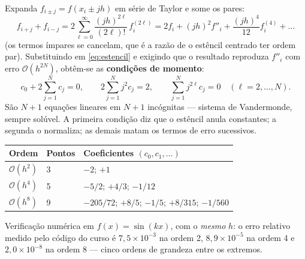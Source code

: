 \documentclass[11pt,a4paper,oneside]{report}
\begin{document}
\begin{derivacao}
Expanda $f_{i\pm j} = f(x_i \pm jh)$ em s\'erie de Taylor e some os pares:
\[
f_{i+j} + f_{i-j}
 = 2\sum_{\ell=0}^{\infty} \frac{(jh)^{2\ell}}{(2\ell)!}\, f^{(2\ell)}_i
 = 2f_i + (jh)^2 f''_i + \frac{(jh)^4}{12}f^{(4)}_i + \dots
\]
(os termos \'impares se cancelam, que \'e a raz\~ao de o est\^encil centrado
ter ordem par). Substituindo em \eqref{eq:estencil} e exigindo que o resultado
reproduza $f''_i$ com erro $\mathcal{O}(h^{2N})$, obt\^em-se as
\textbf{condi\c{c}\~oes de momento}:
\begin{equation}
c_0 + 2\sum_{j=1}^{N} c_j = 0,
\qquad
2\sum_{j=1}^{N} j^{2} c_j = 2,
\qquad
\sum_{j=1}^{N} j^{2\ell} c_j = 0 \quad (\ell = 2,\dots,N).
\end{equation}
S\~ao $N+1$ equa\c{c}\~oes lineares em $N+1$ inc\'ognitas --- sistema de
Vandermonde, sempre sol\'uvel. A primeira condi\c{c}\~ao diz que o est\^encil
anula constantes; a segunda o normaliza; as demais matam os termos de erro
sucessivos.
\end{derivacao}

\begin{center}
\begin{tabular}{@{}llp{7.4cm}@{}}
\toprule
\textbf{Ordem} & \textbf{Pontos} & \textbf{Coeficientes $(c_0, c_1, \dots)$} \\
\midrule
$\mathcal{O}(h^{2})$ & 3 & $-2$; $+1$ \\
$\mathcal{O}(h^{4})$ & 5 & $-5/2$; $+4/3$; $-1/12$ \\
$\mathcal{O}(h^{8})$ & 9 & $-205/72$; $+8/5$; $-1/5$; $+8/315$; $-1/560$ \\
\bottomrule
\end{tabular}
\end{center}

Verifica\c{c}\~ao num\'erica em $f(x) = \sin(kx)$, com o \emph{mesmo} $h$: o
erro relativo medido pelo c\'odigo do curso \'e $7{,}5\times10^{-3}$ na ordem
2, $8{,}9\times10^{-5}$ na ordem 4 e $2{,}0\times10^{-8}$ na ordem 8 --- cinco
ordens de grandeza entre os extremos.
\end{document}
